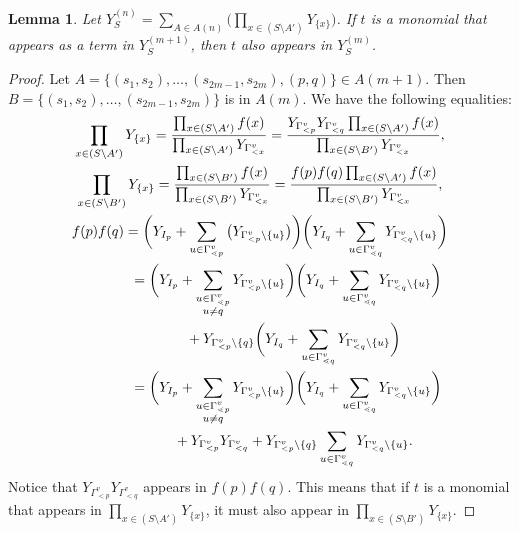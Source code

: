 \documentclass[pdftex]{sigma}
\numberwithin{equation}{section}
\newtheorem{Lemma}[Theorem]{Lemma}
\begin{document}
\begin{Lemma}\label{lem:Y-term-containment}
Let $Y_S^{(n)}=\sum_{A\in A
(n)}\big(\prod_{x\in (S\setminus A')}Y_{\{x\}}\big)$. If $t$ is a monomial that appears as a term in $Y_S^{(m+1)}$, then $t$ also appears in $Y_S^{(m)}$.
\end{Lemma}
\begin{proof}
Let $A=\{(s_1,s_2),\dots,(s_{2m-1},s_{2m}),(p,q)\}\in A(m+1)$. Then $B=\{(s_1,s_2),\dots,(s_{2m-1},\allowbreak s_{2m})\}$ is in $A(m)$. We have the following equalities:
\begin{gather*}
\prod_{x\in (S\setminus A')}Y_{\{x\}} =\frac{\prod_{x\in (S\setminus A')}f(x)}{\prod_{x\in (S\setminus A')}Y_{\Gamma_{< x}^v}}=\frac{Y_{\Gamma_{< p}^v}Y_{\Gamma_{< q}^v}\prod_{x\in (S\setminus A')}f(x)}{\prod_{x\in (S\setminus B')}Y_{\Gamma_{< x}^v}}, \\
\prod_{x\in (S\setminus B')}Y_{\{x\}} =\frac{\prod_{x\in (S\setminus B')}f(x)}{\prod_{x\in (S\setminus B')}Y_{\Gamma_{< x}^v}}=\frac{f(p)f(q)\prod_{x\in (S\setminus A')}f(x)}{\prod_{x\in (S\setminus B')}Y_{\Gamma_{< x}^v}},\\
f(p)f(q)= \bigg(Y_{I_{p}}+\sum_{u\in\Gamma_{\lessdot p}^v}\big(Y_{\Gamma_{< p}^v\setminus\{u\}}\big)\bigg)\bigg(Y_{I_{q}}+\sum_{u\in\Gamma_{\lessdot q}^v}Y_{\Gamma_{< q}^v\setminus\{u\}}\bigg)\\
\hphantom{f(p)f(q)}{}
= \bigg(Y_{I_{p}}+\sum_{\substack{u\in\Gamma_{\lessdot p}^v\\u\neq q}}Y_{\Gamma_{< p}^v\setminus\{u\}}\bigg)\bigg(Y_{I_{q}}+\sum_{u\in\Gamma_{\lessdot q}^v}Y_{\Gamma_{< q}^v\setminus\{u\}}\bigg) \\
\hphantom{f(p)f(q)=}{}+ Y_{\Gamma_{< p}^v\setminus\{q\}}\bigg(Y_{I_{q}}+\sum_{u\in\Gamma_{\lessdot q}^v}Y_{\Gamma_{< q}^v\setminus\{u\}}\bigg)\\
\hphantom{f(p)f(q)}{} = \bigg(Y_{I_{p}}+\sum_{\substack{u\in\Gamma_{\lessdot p}^v\\u\neq q}}Y_{\Gamma_{< p}^v\setminus\{u\}}\bigg)\bigg(Y_{I_{q}}+\sum_{u\in\Gamma_{\lessdot q}^v}Y_{\Gamma_{< q}^v\setminus\{u\}}\bigg)\\
\hphantom{f(p)f(q)=}{} + Y_{\Gamma_{< p}^v}Y_{\Gamma_{< q}^v}+Y_{\Gamma_{< p}^v\setminus\{q\}}\sum_{u\in\Gamma_{\lessdot q}^v}Y_{\Gamma_{< q}^v\setminus\{u\}}.
\end{gather*}
Notice that $Y_{\Gamma_{< p}^v}Y_{\Gamma_{< q}^v}$ appears in $f(p)f(q)$. This means that if $t$ is a monomial that appears in $\prod_{x\in (S\setminus A')}Y_{\{x\}}$, it must also appear in $\prod_{x\in (S\setminus B')}Y_{\{x\}}$.
\end{proof}
\end{document}
